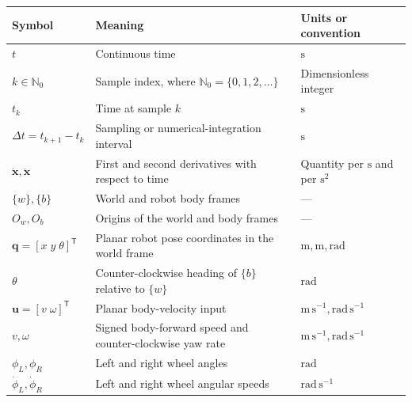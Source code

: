 \documentclass[
  australian,
  12pt,
  letterpaper,
  DIV=11,
  numbers=noendperiod,
  twoside]{scrreprt}
\newcounter{none} %
\begin{document}
{\def\LTcaptype{none} %
\begin{longtable}[]{@{}
  >{\raggedright\arraybackslash}p{}
  >{\raggedright\arraybackslash}p{}
  >{\raggedright\arraybackslash}p{}@{}}
\toprule\noalign{}
\begin{minipage}[b]{\linewidth}\raggedright
Symbol
\end{minipage} & \begin{minipage}[b]{\linewidth}\raggedright
Meaning
\end{minipage} & \begin{minipage}[b]{\linewidth}\raggedright
Units or convention
\end{minipage} \\
\midrule\noalign{}
\endhead
\bottomrule\noalign{}
\endlastfoot
\(t\) & Continuous time & \(\mathrm{s}\) \\
\(k\in\mathbb N_0\) & Sample index, where
\(\mathbb N_0=\{0,1,2,\ldots\}\) & Dimensionless integer \\
\(t_k\) & Time at sample \(k\) & \(\mathrm{s}\) \\
\(\Delta t=t_{k+1}-t_k\) & Sampling or numerical-integration interval &
\(\mathrm{s}\) \\
\(\dot{\mathbf{x}},\ddot{\mathbf{x}}\) & First and second derivatives
with respect to time & Quantity per \(\mathrm{s}\) and per
\(\mathrm{s}^2\) \\
\(\{w\},\{b\}\) & World and robot body frames & --- \\
\(O_w,O_b\) & Origins of the world and body frames & --- \\
\(\mathbf{q}=[x\;y\;\theta]^\mathsf{T}\) & Planar robot pose coordinates
in the world frame & \(\mathrm{m},\mathrm{m},\mathrm{rad}\) \\
\(\theta\) & Counter-clockwise heading of \(\{b\}\) relative to
\(\{w\}\) & \(\mathrm{rad}\) \\
\(\mathbf u=[v\;\omega]^\mathsf T\) & Planar body-velocity input &
\(\mathrm{m\,s^{-1}},\mathrm{rad\,s^{-1}}\) \\
\(v,\omega\) & Signed body-forward speed and counter-clockwise yaw rate
& \(\mathrm{m\,s^{-1}},\mathrm{rad\,s^{-1}}\) \\
\(\phi_L,\phi_R\) & Left and right wheel angles & \(\mathrm{rad}\) \\
\(\dot{\phi}_L,\dot{\phi}_R\) & Left and right wheel angular speeds &
\(\mathrm{rad\,s^{-1}}\) \\

\end{longtable}}
\end{document}
